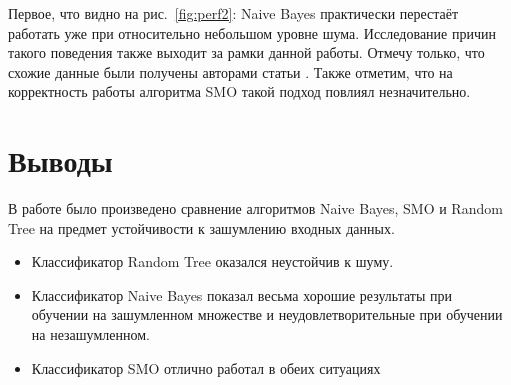 \documentclass{article}
\begin{document}
Первое, что видно на рис.~\ref{fig:perf2}: Naive Bayes практически перестаёт работать уже при относительно небольшом уровне шума. Исследование причин такого поведения также выходит за рамки данной работы. Отмечу только, что схожие данные были получены авторами статьи \cite{glick2004enrichment}. Также отметим, что на корректность работы алгоритма SMO такой подход повлиял незначительно.


\section{Выводы}
В работе было произведено сравнение алгоритмов Naive Bayes, SMO и Random Tree на предмет устойчивости к зашумлению входных данных. 
\begin{itemize}
\item{Классификатор Random Tree оказался неустойчив к шуму.}
\item{Классификатор Naive Bayes показал весьма хорошие результаты при обучении на зашумленном множестве и неудовлетворительные при обучении на незашумленном.}
\item{Классификатор SMO отлично работал в обеих ситуациях}
\end{itemize}
\clearpage

{}
\end{document}
